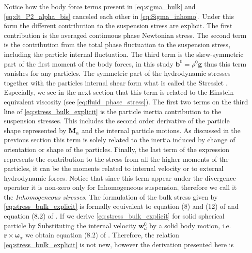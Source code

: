 Notice how the body force terms present in \ref{eq:sigma_bulk} and \ref{eq:dt_P2_alpha_bis} canceled each other in \ref{eq:Sigma_inhomo}. 
Under this form the different contribution to the suspension stress are explicit. 
The first contribution is the averaged continuous phase Newtonian stress. 
The second term is the  contribution from the total phase fluctuation to the suspension stress, including the particle internal fluctuation. 
The third term is the skew-symmetric part of the first moment of the body forces, in this study $\textbf{b}^0 = \rho^0 \textbf{g}$ thus this term vanishes for any particles. 
The symmetric part of the hydrodynamic stresses together with the particles internal shear form what is called the Stresslet \citep{pozrikidis1992boundary}. 
Especially, we see in the next section that this term is related to the Einstein equivalent viscosity (see \ref{eq:fluid_phase_stress}). 
The first two terms on the third line of \ref{eq:stress_bulk_explicit} is the particle inertia contribution to the suspension stresses. 
This includes the second order derivative of the particle shape represented by $\textbf{M}_\alpha$ and the internal particle motions. 
As discussed in the previous section this term is solely related to the inertia induced by change of orientation or shape of the particles. 
Finally, the last term of the expression represents the contribution to the stress from all the higher moments of the particles, it can be the moments related to internal velocity or to external hydrodynamic forces.  
Notice that since this term appear under the divergence operator it is non-zero only for Inhomogeneous suspension, therefore we call it the \textit{Inhomogeneous stresses}. 
The formulation of the bulk stress given by \ref{eq:stress_bulk_explicit} is formally equivalent to equation (8) and (12) of \citet{lhuillier1996contribution} and equation (8.2) of \citet{zhang1997momentum}.
If we derive \ref{eq:stress_bulk_explicit} for solid spherical particle by Substituting the internal velocity $\textbf{w}_d^0$ by a solid body motion, i.e. $\textbf{r}\times\bm\omega_\alpha$ we obtain equation (8.2) of \citet{zhang1997momentum}. 
Therefore, the relation \ref{eq:stress_bulk_explicit} is not new, however the derivation presented here is 


